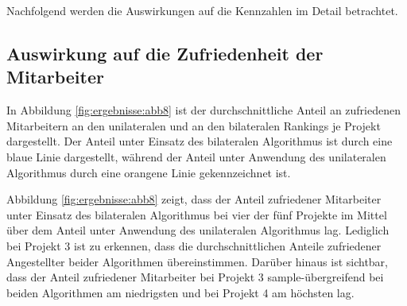 Nachfolgend werden die Auswirkungen auf die Kennzahlen im Detail betrachtet.

\subsection{Auswirkung auf die Zufriedenheit der Mitarbeiter}
In Abbildung \ref{fig:ergebnisse:abb8} ist der durchschnittliche Anteil an zufriedenen Mitarbeitern an den unilateralen und an den bilateralen Rankings je Projekt dargestellt.
Der Anteil unter Einsatz des bilateralen Algorithmus ist durch eine blaue Linie dargestellt, während der Anteil unter Anwendung des unilateralen Algorithmus durch eine orangene Linie gekennzeichnet ist.

Abbildung \ref{fig:ergebnisse:abb8} zeigt, dass der Anteil zufriedener Mitarbeiter unter Einsatz des bilateralen Algorithmus bei vier der fünf Projekte im Mittel über dem Anteil unter Anwendung des unilateralen Algorithmus lag.
Lediglich bei Projekt 3 ist zu erkennen, dass die durchschnittlichen Anteile zufriedener Angestellter beider Algorithmen übereinstimmen.
Darüber hinaus ist sichtbar, dass der Anteil zufriedener Mitarbeiter bei Projekt 3 sample-übergreifend bei beiden Algorithmen am niedrigsten und bei Projekt 4 am höchsten lag.

